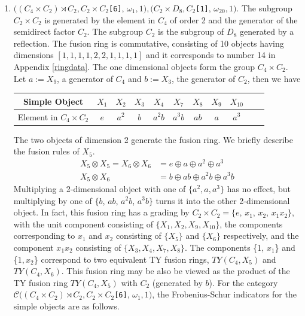 \documentclass[a4paper, 10pt]{book}
\theoremstyle{definition}
\numberwithin{equation}{chapter}
\newcommand\lstl{\lstinline}
\newcommand\ot{\otimes}
\newcommand\C{\mathcal C}
\newcommand\semidir\rtimes
\begin{document}
\begin{enumerate}
 	\item \label{ex1}$((C_4 \times C_2) \semidir C_2, C_2\times C_2$\lstl{[6]}, $\omega_1, 1), (C_2 \times D_8, C_2$\lstl{[1]}, $\omega_{20}, 1).$ The subgroup $C_2\times C_2$ is generated by the element in $C_4$ of order 2 and the generator of the semidirect factor $C_2$. The subgroup $C_2$ is the subgroup of $D_8$ generated by a reflection. The fusion ring is commutative, consisting of 10 objects having dimensions $[1, 1, 1, 1, 2, 2, 1, 1, 1, 1]$ and it corresponds to number 14 in Appendix \ref{ringdata}. The one dimensional objects form the group $C_4 \times C_2$. Let $a:=X_9$, a generator of $C_4$ and $b:=X_3$, the generator of $C_2$, then we have
\begin{center}
\begin{tabular}{ | c|c|c|c|c|c|c|c|c|c|c|}
\hline
Simple Object &$X_1$ &  $X_2$ & $X_3$  & $X_4$ & $X_7$ & $X_8$ & $X_9$ & $X_{10}$    \\ 
\hline
Element in $C_4\times C_2$ & $e$ & $a^2$ & $b$ &  $a^2b$ & $a^3b$ & $ab$ & $a$ & $a^3$\\
\hline
\end{tabular}
\end{center}
The two objects of dimension 2 generate the fusion ring. We briefly describe the fusion rules of $X_5$. \begin{align*}
	X_5 \ot X_5 =X_6\ot X_6 &= e \oplus a\oplus a^2 \oplus a^3\\
	X_5\ot X_6 &= b\oplus ab \oplus a^2b \oplus a^3b
\end{align*} 
  Multiplying a 2-dimensional object with one of $\{a^2, a, a^3\}$ has no effect, but multiplying by one of $\{b$, $ab$, $a^2b$, $a^3b\}$ turns it into the other 2-dimensional object. In fact, this fusion ring has a grading by $C_2 \times C_2 = \{e$, $x_1$, $x_2$, $x_1x_2\}$, with the unit component  consisting of $\{X_1, X_2, X_9, X_{10}\}$, the components corresponding to $x_1$ and $x_2$ consisting of $\{X_5\}$ and $\{X_6\}$ respectively, and the component $x_1x_2$ consisting of $\{X_3, X_4, X_7, X_8\}$. The components \{1, $x_1$\} and \{$1, x_2$\} correspond to two equivalent TY fusion rings, $TY(C_4, X_5)$ and $TY(C_4, X_6)$. This fusion ring may be also be viewed as the product of the TY fusion ring $TY(C_4, X_5)$ with $C_2$ (generated by $b$). 
For the category $\C((C_4 \times C_2) \semidir C_2, C_2\times C_2$\lstl{[6]}, $\omega_1, 1)$, the Frobenius-Schur indicators for the simple objects are as follows.
\begin{center}
\begin{tabular}{|c|c|}

\end{tabular}
\end{center}
\end{enumerate}
\end{document}

